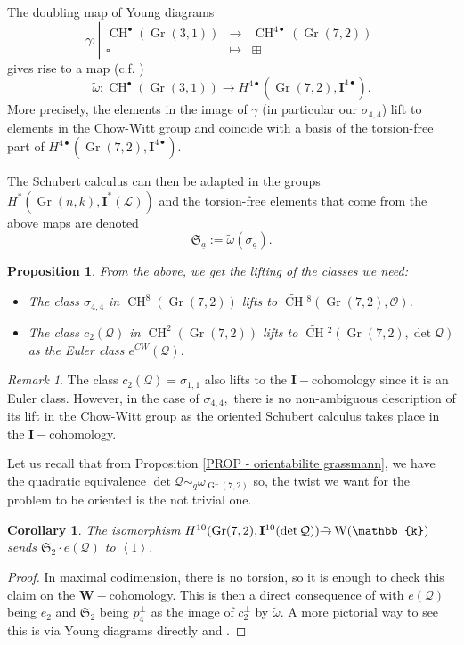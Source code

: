 \documentclass{amsart}
\theoremstyle{plain}%
\newtheorem{prop}[subsubsection]{Proposition}
\newtheorem{cor}[subsubsection]{Corollary}
\theoremstyle{remark}
\newtheorem{rmq}[subsubsection]{Remark}
\theoremstyle{definition}
\newcommand{\cL}{\mathcal{L}}
\newcommand{\cO}{\mathcal{O}}
\newcommand{\cQ}{\mathcal{Q}}
\newcommand{\ek}{\mathbb{k}}
\newcommand{\fS}{\mathfrak{S}}
\newcommand{\bfW}{\mathbf{W}}
\newcommand{\fId}{{\mathbf{I}}}
\newcommand{\Witt}{\operatorname{W}}
\newcommand{\Chowtilde}[2][]{\widetilde{\operatorname{CH}}{}^{#1}\!\left(#2\right)}
\newcommand{\simquad}{\sim_q}
\newcommand{\qscal}[1]{\left\langle #1 \right\rangle}
\newcommand{\isomr}{\Tilde{\to}}
\newcommand{\Grass}{\operatorname{Gr}}
\newcommand{\Chowct}[2][]{\operatorname{CH}^{#1}\!\left( #2 \right)}
\begin{document}
The doubling map of Young diagrams
\[\gamma : \left|\begin{array}{ccc}
    \Chowct[\bullet]{\Grass(3,1)} & \to & \Chowct[4\bullet]{\Grass(7,2)} \\
    \square & \mapsto & \boxplus
\end{array}\right.\]
gives rise to a map (c.f. \cite[Remark 3.2]{Wendt_oriented-schubert})
\[\tilde{\omega} : \Chowct[\bullet]{\Grass(3,1)} \to H^{4\bullet}(\Grass(7,2),\fId^{4\bullet}).\]
More precisely, the elements in the image of $\gamma$ (in particular our $\sigma_{4,4}$) lift to elements in the Chow-Witt group and coincide with a basis of the torsion-free part of $H^{4\bullet}(\Grass(7,2),\fId^{4\bullet}).$

The Schubert calculus can then be adapted in the groups $H^\ast(\Grass(n,k),\fId^\ast(\cL))$ and the torsion-free elements that come from the above maps are denoted
\[\fS_{\underline{a}} := \tilde{\omega}(\sigma_{\underline{a}}).\]
\begin{prop}From the above, we get the lifting of the classes we need:
\begin{itemize}
    \item The class $\sigma_{4,4}$ in $\Chowct[8]{\Grass(7,2)}$ lifts to $\Chowtilde[8]{\Grass(7,2),\cO}$.
    \item The class $c_2(\cQ)$ in $\Chowct[2]{\Grass(7,2)}$ lifts to $\Chowtilde[2]{\Grass(7,2),\det \cQ}$ as the Euler class $e^{CW}(\cQ).$
\end{itemize}
\end{prop}


\begin{rmq}
The class $c_2(\cQ) = \sigma_{1,1}$ also lifts to the $\fId-$cohomology since it is an Euler class. However, in the case of $\sigma_{4,4},$ there is no non-ambiguous description of its lift in the Chow-Witt group as the oriented Schubert calculus takes place in the $\fId-$cohomology.
\end{rmq}

Let us recall that from Proposition \ref{PROP - orientabilite grassmann}, we have the quadratic equivalence $\det \cQ \simquad \omega_{\Grass(7,2)}$ so, the twist we want for the problem to be oriented is the not trivial one.

\begin{cor}
The isomorphism $H^{10}(\Grass(7,2),\fId^{10}(\det \cQ)) \isomr \Witt(\ek)$ sends $\fS_{2}\cdot e(\cQ)$ to $\qscal{1}$.
\end{cor}

\begin{proof}
In maximal codimension, there is no torsion, so it is enough to check this claim on the $\bfW-$cohomology. This is then a direct consequence of \cite[Theorem 6.4]{Wendt_CHW-grass} with $e(\cQ)$ being $e_2$ and $\fS_{2}$ being $p_4^\perp$ as the image of $c_2^\perp$ by $\tilde{\omega}.$ A more pictorial way to see this is via Young diagrams directly and \cite[Proposition 3.14]{Wendt_oriented-schubert}.  
\end{proof}
\end{document}
